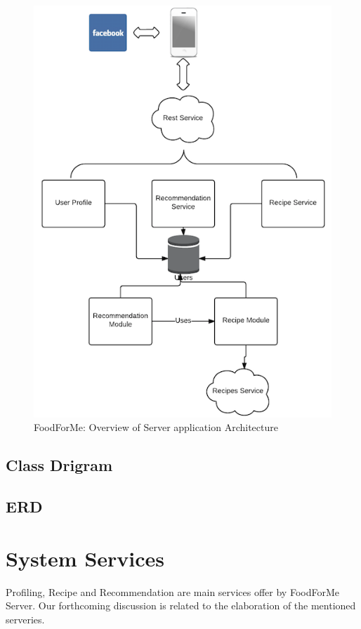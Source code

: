	\begin{figure}[h]
	   	\centering
	   	\includegraphics[width=.55\linewidth]{figures/ch4_architechture_diagram.png}
	   	\caption{FoodForMe: Overview of Server application Architecture}
	   	\label{fig:ch4_architechture_diagram.png}
	   \end{figure}
	   
\subsection{Class Drigram}

\subsection{ERD}

\section{System Services}

Profiling, Recipe and Recommendation are main services offer by FoodForMe Server. Our forthcoming discussion is related to the elaboration of the mentioned serveries. 


